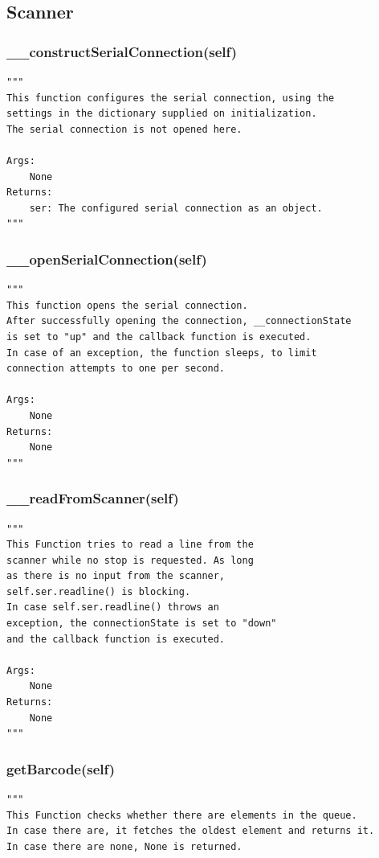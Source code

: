 \documentclass[12pt]{article}
\begin{document}
{\subsection{Scanner}

\subsubsection{\_\_constructSerialConnection(self)}
\label{func:constructSerialConnection}
\begin{verbatim}
"""
This function configures the serial connection, using the
settings in the dictionary supplied on initialization.
The serial connection is not opened here.

Args: 
    None
Returns:
    ser: The configured serial connection as an object.
"""
\end{verbatim}

\subsubsection{\_\_openSerialConnection(self)}
\label{func:openSerialConnection}
\begin{verbatim}
"""
This function opens the serial connection.
After successfully opening the connection, __connectionState 
is set to "up" and the callback function is executed.
In case of an exception, the function sleeps, to limit 
connection attempts to one per second.

Args: 
    None
Returns:
    None
"""
\end{verbatim}

\subsubsection{\_\_readFromScanner(self)}
\label{func:readFromScanner}
\begin{verbatim}
"""
This Function tries to read a line from the 
scanner while no stop is requested. As long
as there is no input from the scanner, 
self.ser.readline() is blocking.
In case self.ser.readline() throws an 
exception, the connectionState is set to "down"
and the callback function is executed.

Args: 
    None
Returns:
    None
"""
\end{verbatim}

\subsubsection{getBarcode(self)}
\label{func:getBarcode}
\begin{verbatim}
"""
This Function checks whether there are elements in the queue.
In case there are, it fetches the oldest element and returns it.
In case there are none, None is returned.


\end{verbatim}}
\end{document}
